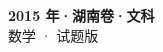 \documentclass[zihao=-4, a4paper]{ctexart}
\begin{document}
\begin{center}
  {\Large\bfseries 2015 年·湖南卷·文科}\\[4pt]
  {\large 数学 · 试题版}
\end{center}
\medskip
{}

\end{document}
